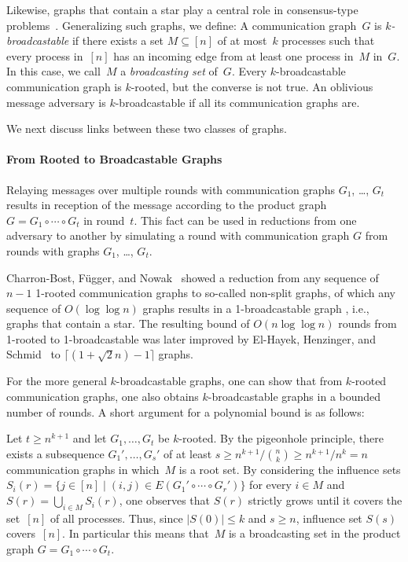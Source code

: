 \documentclass[a4paper,USenglish]{lipics-v2021}
\renewcommand{\leq}{\leqslant}
\renewcommand{\geq}{\geqslant}
\begin{document}
Likewise, graphs that contain a star play a central role in consensus-type problems~\cite{charron09:HO}.
Generalizing such graphs, we define:
A communication graph~$G$ is \emph{$k$-broadcastable} if there exists a set
$M\subseteq[n]$ of at most~$k$ processes such that every process in~$[n]$
has an incoming edge from at least one process in~$M$ in~$G$.
In this case, we call~$M$ a \emph{broadcasting set} of~$G$.
Every $k$-broadcastable communication graph is $k$-rooted, but the converse is
not true.
An oblivious message adversary is $k$-broadcastable if all its communication graphs are.

We next discuss links between these two classes of graphs.


\paragraph*{From Rooted to Broadcastable Graphs}

Relaying messages over multiple rounds with communication graphs $G_1$, \dots, $G_t$ results in reception of the message according to the product graph $G = G_1 \circ\cdots\circ G_t$ in round~$t$.
This fact can be used in reductions from one adversary to another by simulating a round with communication graph $G$ from rounds with graphs $G_1$, \dots, $G_t$.

Charron-Bost, Függer, and Nowak~\cite{CBFN15:icalp} showed a reduction from any sequence of $n-1$ 1-rooted communication graphs to so-called non-split graphs, of which any sequence of $O(\log\log n)$ graphs results in a 1-broadcastable graph \cite{fugger2020radius}, i.e., graphs that contain a star.
The resulting bound of $O(n \log\log n)$ rounds from 1-rooted to 1-broadcastable was later improved by El-Hayek, Henzinger, and Schmid~\cite{el2023asymptotically} to $\lceil(1+\sqrt{2}n)-1\rceil$ graphs.

For the more general $k$-broadcastable graphs, one can show that from $k$-rooted communication graphs, one also obtains $k$-broadcastable graphs in a bounded number of rounds.
A short argument for a polynomial bound is as follows:

Let $t \geq n^{k+1}$ and let $G_1,\dots,G_t$ be $k$-rooted.
By the pigeonhole principle, there exists a subsequence $G_1',\dots,G_s'$ of at least
$s \geq n^{k+1}/\binom{n}{k}\geq n^{k+1}/n^k = n$ communication graphs in which~$M$ is a root set.
By considering the influence sets
$S_i(r) = \big\{ j\in[n] \mid (i,j) \in E(G_1'\circ \cdots \circ G_r') \big\}$ for every $i\in M$ and
$S(r) = \bigcup_{i \in M} S_i(r)$,
one observes that $S(r)$ strictly grows until it covers the set~$[n]$ of all processes.
Thus, since $\lvert S(0)\rvert \leq k$ and $s \geq n$, influence set $S(s)$ covers~$[n]$.
In particular this means that~$M$ is a broadcasting set in the product graph $G = G_1\circ\cdots\circ G_t$.
\end{document}
